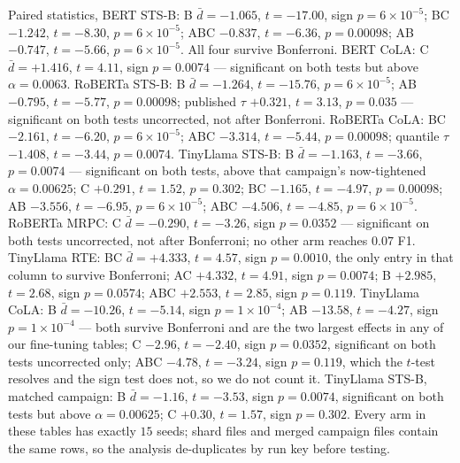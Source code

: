 \documentclass{article}
\begin{document}
Paired statistics, BERT STS-B: B $\bar{d}=-1.065$, $t=-17.00$, sign
$p=6\times10^{-5}$; BC $-1.242$, $t=-8.30$, $p=6\times10^{-5}$; ABC $-0.837$,
$t=-6.36$, $p=0.00098$; AB $-0.747$, $t=-5.66$, $p=6\times10^{-5}$. All four
survive Bonferroni. BERT CoLA: C $\bar{d}=+1.416$, $t=4.11$, sign $p=0.0074$ ---
significant on both tests but above $\alpha=0.0063$. RoBERTa STS-B: B
$\bar{d}=-1.264$, $t=-15.76$, $p=6\times10^{-5}$; AB $-0.795$, $t=-5.77$,
$p=0.00098$; published $\tau$ $+0.321$, $t=3.13$, $p=0.035$ --- significant on
both tests uncorrected, not after Bonferroni. RoBERTa CoLA: BC $-2.161$,
$t=-6.20$, $p=6\times10^{-5}$; ABC $-3.314$, $t=-5.44$, $p=0.00098$; quantile
$\tau$ $-1.408$, $t=-3.44$, $p=0.0074$. TinyLlama STS-B: B $\bar{d}=-1.163$,
$t=-3.66$, $p=0.0074$ --- significant on both tests, above that campaign's
now-tightened $\alpha=0.00625$; C $+0.291$, $t=1.52$, $p=0.302$; BC $-1.165$,
$t=-4.97$, $p=0.00098$; AB $-3.556$, $t=-6.95$, $p=6\times10^{-5}$; ABC
$-4.506$, $t=-4.85$, $p=6\times10^{-5}$. RoBERTa MRPC: C $\bar{d}=-0.290$,
$t=-3.26$, sign $p=0.0352$ --- significant on both tests uncorrected, not after
Bonferroni; no other arm reaches $0.07$ F1. TinyLlama RTE: BC $\bar{d}=+4.333$,
$t=4.57$, sign $p=0.0010$, the only entry in that column to survive Bonferroni;
AC $+4.332$, $t=4.91$, sign $p=0.0074$; B $+2.985$, $t=2.68$, sign $p=0.0574$;
ABC $+2.553$, $t=2.85$, sign $p=0.119$. TinyLlama CoLA: B $\bar{d}=-10.26$,
$t=-5.14$, sign $p=1\times10^{-4}$; AB $-13.58$, $t=-4.27$, sign
$p=1\times10^{-4}$ --- both survive Bonferroni and are the two largest effects
in any of our fine-tuning tables; C $-2.96$, $t=-2.40$, sign $p=0.0352$,
significant on both tests uncorrected only; ABC $-4.78$, $t=-3.24$, sign
$p=0.119$, which the $t$-test resolves and the sign test does not, so we do not
count it. TinyLlama STS-B, matched campaign: B $\bar{d}=-1.16$, $t=-3.53$, sign
$p=0.0074$, significant on both tests but above $\alpha=0.00625$; C $+0.30$,
$t=1.57$, sign $p=0.302$. Every arm in these tables has exactly
$15$ seeds; shard files and merged campaign files contain the same rows, so the
analysis de-duplicates by run key before testing.
\end{document}
